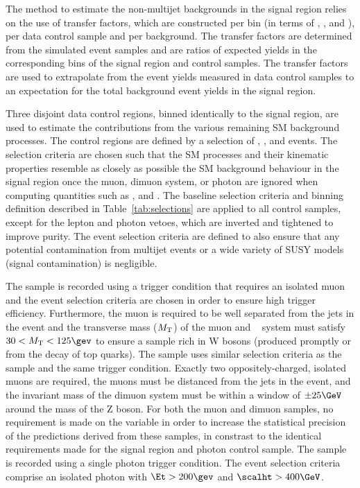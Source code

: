 The method to estimate the non-multijet backgrounds in the signal
region relies on the use of transfer factors, which are constructed
per bin (in terms of \njet, \nb, and \scalht), per data control
sample and per background. The transfer factors are determined from the simulated event
samples and are ratios of expected yields in the corresponding bins of
the signal region and control samples. The transfer factors are used
to extrapolate from the event yields measured in data control samples
to an expectation for the total background event yields in the signal
region.

Three disjoint data control regions, binned identically to the signal
region, are used to estimate the contributions from the various
remaining SM background processes. The control regions are defined by
a selection of \mj, \mmj, and \gj events. The selection criteria are
chosen such that the SM processes and their kinematic properties
resemble as closely as possible the SM background behaviour in the
signal region once the muon, dimuon system, or photon are ignored when
computing quantities such as \scalht, \mht and \alphat. The baseline
selection criteria and binning definition described in
Table~\ref{tab:selections} are applied to all control samples, except
for the lepton and photon vetoes, which are inverted and tightened to
improve purity. The event selection criteria are defined to also
ensure that any potential contamination from multijet events or a wide
variety of SUSY models (\ie signal contamination) is negligible.

The \mj sample is recorded using a trigger condition that requires an
isolated muon and the event selection criteria are chosen in order to
ensure high trigger efficiency. Furthermore, the muon is required to
be well separated from the jets in the event and the transverse mass
($M_{\rm T}$) of the muon and \ETmiss~\cite{CMS-PAS-PFT-09-001,
  CMS-PAS-PFT-10-001} system must satisfy $30 < M_{\rm T} < 125\gev$
to ensure a sample rich in W bosons (produced promptly or from the
decay of top quarks). The \mmj sample uses similar selection criteria
as the \mj sample and the same trigger condition. Exactly two
oppositely-charged, isolated muons are required, the muons must be
distanced from the jets in the event, and the invariant mass of the
dimuon system must be within a window of $\pm 25\GeV$ around the mass
of the Z boson. For both the muon and dimuon samples, no requirement
is made on the variable \alphat in order to increase the statistical
precision of the predictions derived from these samples, in constrast
to the identical \alphat requirements made for the signal region and
photon control sample. The \gj sample is recorded using a single
photon trigger condition. The event selection criteria comprise an
isolated photon with $\Et > 200\gev$ and $\scalht > 400\GeV$.


